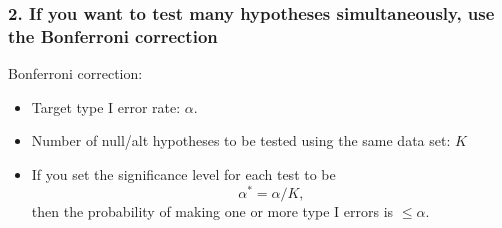 \documentclass[11pt,containsverbatim,handout,xcolor=xelatex,dvipsnames,table]{beamer}
\newcommand{\bonferroni}{If you want to test many hypotheses simultaneously, use the Bonferroni correction}
\begin{document}

\begin{frame}
  \frametitle{2. \bonferroni}

\vfill

Bonferroni correction: 
\begin{itemize}
\item Target type I error rate: $\alpha$.

\item Number of null/alt hypotheses to be tested using the same data set: $K$

\item If you set the significance level for each test to be
\[
\alpha^* = \alpha / K,
\]
then the probability of making one or more type I errors is $ \leq \alpha$.

\end{itemize}

\vfill

\end{frame}


\begin{frame}
  \frametitle{}

\vfill


\vfill

\end{frame}

\end{document}
